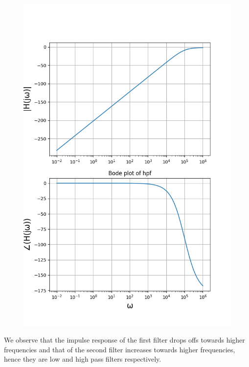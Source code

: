 \documentclass[11pt, a4paper]{article}
\begin{document}
\begin{figure}[!tbh]
   	\centering
   	\includegraphics[scale=0.5]{img2.png}
   	\label{fig:32}
   \end{figure}

{ 
We observe that the impulse response of the first filter drops offs towards higher frequencies and that of the second filter increases towards higher frequencies, hence they are low and high pass filters respectively.
}
\end{document}
